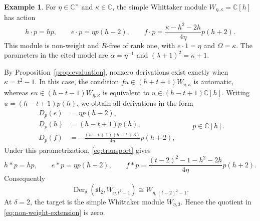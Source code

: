 \documentclass[11pt,reqno]{amsart}
\numberwithin{equation}{section}
\newcommand{\C}{\mathbb C}
\newcommand{\s}{\mathfrak{sl}_2}
\DeclareMathOperator{\Der}{Der}
\theoremstyle{definition}
\newtheorem{example}[theorem]{Example}
\theoremstyle{remark}
\begin{document}
\begin{example}\label{ex:whittaker}
For \(\eta\in\C^\times\) and \(\kappa\in\C\), the
simple Whittaker module \(W_{\eta,\kappa}=\C[h]\)
\cite{Maz10} has action
\begin{equation}\label{eq:whittaker-source}
h\cdot p=hp,\qquad e\cdot p=\eta p(h-2),\qquad
f\cdot p=\frac{\kappa-h^2-2h}{4\eta}p(h+2).
\end{equation}
This module is non-weight and \(R\)-free of rank one, with
\(e\cdot1=\eta\) and \(\Omega=\kappa\).
The parameters in the cited model are \(\alpha=\eta^{-1}\) and
\((\lambda+1)^2=\kappa+1\).

By Proposition~\ref{prop:evaluation}, nonzero derivations exist
exactly when \(\kappa=t^2-1\). In this case, the condition
\(fu\in(h+t+1)W_{\eta,\kappa}\) is automatic, whereas
\(eu\in(h-t-1)W_{\eta,\kappa}\) is equivalent to
\(u\in(h-t+1)\C[h]\). Writing \(u=(h-t+1)p(h)\), we obtain
all derivations in the form
\begin{equation}\label{eq:whittaker-derivations}
\begin{aligned}
D_p(e)&=\eta p(h-2),\\
D_p(h)&=(h-t+1)p(h),\\
D_p(f)&=-\frac{(h-t+1)(h-t+3)}{4\eta}p(h+2),
\end{aligned}
\qquad p\in\C[h].
\end{equation}
Under this parametrization, \eqref{eq:transport} gives
\[
h*p=hp,\qquad e*p=\eta p(h-2),\qquad
f*p=\frac{(t-2)^2-1-h^2-2h}{4\eta}p(h+2).
\]
Consequently
\begin{equation}\label{eq:whittaker-target}
\Der_\delta(\s,W_{\eta,t^2-1})
\cong W_{\eta,(t-2)^2-1}.
\end{equation}
At \(\delta=2\), the target is the simple Whittaker module
\(W_{\eta,3}\). Hence the quotient in
\eqref{eq:non-weight-extension} is zero.
\end{example}
\end{document}
